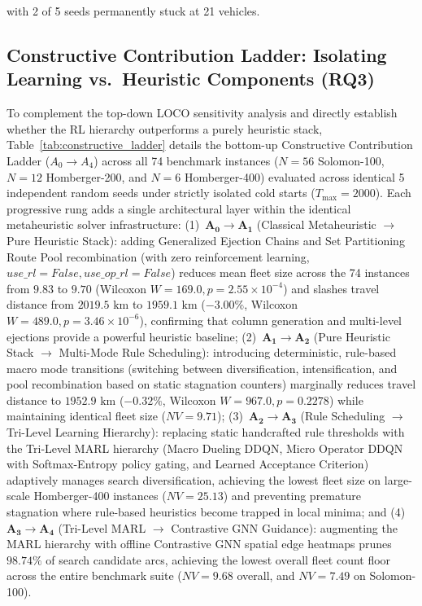 \documentclass{ieeeaccess}
\begin{document}
with 2 of 5 seeds permanently stuck at 21 vehicles.


\subsection{Constructive Contribution Ladder: Isolating Learning vs.\ Heuristic Components (RQ3)}
\label{sec:constructive_ladder}

To complement the top-down LOCO sensitivity analysis and directly establish whether the RL hierarchy outperforms a purely heuristic stack, Table~\ref{tab:constructive_ladder} details the bottom-up Constructive Contribution Ladder ($A_0 \to A_4$) across all 74 benchmark instances ($N=56$ Solomon-100, $N=12$ Homberger-200, and $N=6$ Homberger-400) evaluated across identical 5 independent random seeds under strictly isolated cold starts ($T_{\max}=2000$). Each progressive rung adds a single architectural layer within the identical metaheuristic solver infrastructure: (1)~$\mathbf{A_0 \to A_1}$ (Classical Metaheuristic $\to$ Pure Heuristic Stack): adding Generalized Ejection Chains and Set Partitioning Route Pool recombination (with zero reinforcement learning, $use\_rl=False, use\_op\_rl=False$) reduces mean fleet size across the 74 instances from $9.83$ to $9.70$ (Wilcoxon $W=169.0, p=2.55 \times 10^{-4}$) and slashes travel distance from $2019.5\text{ km}$ to $1959.1\text{ km}$ ($-3.00\%$, Wilcoxon $W=489.0, p=3.46 \times 10^{-6}$), confirming that column generation and multi-level ejections provide a powerful heuristic baseline; (2)~$\mathbf{A_1 \to A_2}$ (Pure Heuristic Stack $\to$ Multi-Mode Rule Scheduling): introducing deterministic, rule-based macro mode transitions (switching between diversification, intensification, and pool recombination based on static stagnation counters) marginally reduces travel distance to $1952.9\text{ km}$ ($-0.32\%$, Wilcoxon $W=967.0, p=0.2278$) while maintaining identical fleet size ($NV=9.71$); (3)~$\mathbf{A_2 \to A_3}$ (Rule Scheduling $\to$ Tri-Level Learning Hierarchy): replacing static handcrafted rule thresholds with the Tri-Level MARL hierarchy (Macro Dueling DDQN, Micro Operator DDQN with Softmax-Entropy policy gating, and Learned Acceptance Criterion) adaptively manages search diversification, achieving the lowest fleet size on large-scale Homberger-400 instances ($NV=25.13$) and preventing premature stagnation where rule-based heuristics become trapped in local minima; and (4)~$\mathbf{A_3 \to A_4}$ (Tri-Level MARL $\to$ Contrastive GNN Guidance): augmenting the MARL hierarchy with offline Contrastive GNN spatial edge heatmaps prunes $98.74\%$ of search candidate arcs, achieving the lowest overall fleet count floor across the entire benchmark suite ($NV=9.68$ overall, and $NV=7.49$ on Solomon-100).
\end{document}
